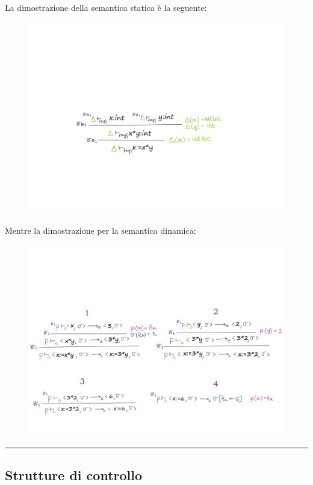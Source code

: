 \documentclass[a4paper]{article}
\newcommand{\longline}{\noindent\rule{\textwidth}{0.4pt}}
\begin{document}
 	La dimostrazione della semantica statica è la seguente:
 	\begin{figure}[!htp]
 		\centering
 		\includegraphics[width=.8\textwidth]{img/esempio_assegnamento_sem-statica.pdf}
 	\end{figure}\newpage
 	
 	\noindent
 	Mentre la dimostrazione per la semantica dinamica:
 	\begin{figure}[!htp]
 		\centering
 		\includegraphics[width=\textwidth]{img/esempio_assegnamento_sem-dinamica.pdf}
 	\end{figure}
 	
 	\longline
 	
 	\subsection{Strutture di controllo}
 	
\end{document}
